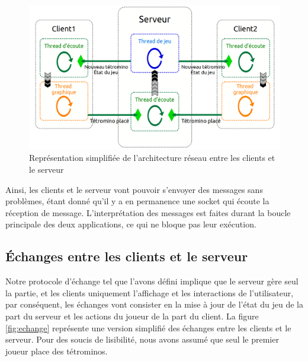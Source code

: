 \documentclass[a4paper, 12pt]{article}
\begin{document}
			\begin{figure}[bt]
				\centering
				\includegraphics[scale=0.35]{img/archi_reseau.png}
				\caption{Représentation simplifiée de l'architecture réseau entre les clients et le serveur}
				\label{fig:rezo}
			\end{figure}

			Ainsi, les clients et le serveur vont pouvoir s'envoyer des messages sans problèmes, étant donné qu'il y a en permanence une socket qui écoute la réception de message. L'interprétation des messages est faites durant la boucle principale des deux applications, ce qui ne bloque pas leur exécution.

		\subsection{\'Echanges entre les clients et le serveur}

			Notre protocole d'échange tel que l'avons défini implique que le serveur gère seul la partie, et les clients uniquement l'affichage et les interactions de l'utilisateur, par conséquent, les échanges vont consister en la mise à jour de l'état du jeu de la part du serveur et les actions du joueur de la part du client. 
			La figure \ref{fig:echange} représente une version simplifié des échanges entre les clients et le serveur. Pour des soucis de lisibilité, nous avons assumé que seul le premier joueur place des tétrominos.
\end{document}
